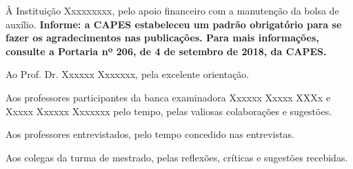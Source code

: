 
À Instituição  Xxxxxxxxx, pelo apoio financeiro com a manutenção da bolsa de auxílio. \textbf{Informe: a CAPES estabeleceu um padrão obrigatório para se fazer os agradecimentos nas publicações. Para mais informações, consulte a Portaria nº 206, de 4 de setembro de 2018, da CAPES.}

Ao Prof. Dr. Xxxxxx Xxxxxxx, pela excelente orientação.

Aos professores participantes da banca examinadora Xxxxxx Xxxxx XXXx e Xxxxx Xxxxxx Xxxxxxx pelo tempo, pelas valiosas colaborações e sugestões.

Aos professores entrevistados, pelo tempo concedido nas entrevistas.

Aos colegas da turma de mestrado, pelas reflexões, críticas e sugestões recebidas.